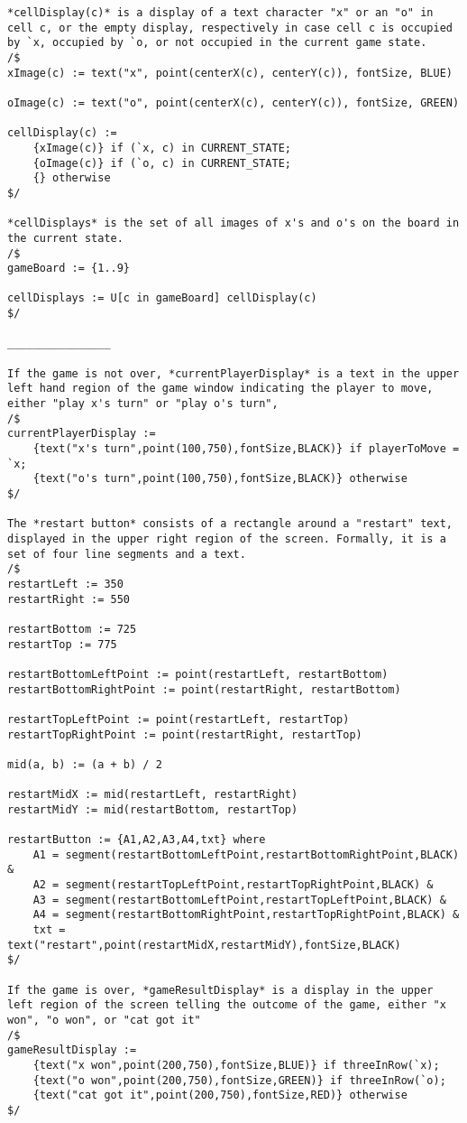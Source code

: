 \documentclass[letterpaper, 14pt]{extarticle}
\begin{document}
\begin{flushleft}
\begin{lstlisting}
*cellDisplay(c)* is a display of a text character "x" or an "o" in cell c, or the empty display, respectively in case cell c is occupied by `x, occupied by `o, or not occupied in the current game state.
/$
xImage(c) := text("x", point(centerX(c), centerY(c)), fontSize, BLUE)

oImage(c) := text("o", point(centerX(c), centerY(c)), fontSize, GREEN)

cellDisplay(c) :=
    {xImage(c)} if (`x, c) in CURRENT_STATE;
    {oImage(c)} if (`o, c) in CURRENT_STATE;
    {} otherwise
$/

*cellDisplays* is the set of all images of x's and o's on the board in the current state.
/$
gameBoard := {1..9}

cellDisplays := U[c in gameBoard] cellDisplay(c)
$/

________________

If the game is not over, *currentPlayerDisplay* is a text in the upper left hand region of the game window indicating the player to move, either "play x's turn" or "play o's turn",
/$
currentPlayerDisplay :=
    {text("x's turn",point(100,750),fontSize,BLACK)} if playerToMove = `x;
    {text("o's turn",point(100,750),fontSize,BLACK)} otherwise
$/

The *restart button* consists of a rectangle around a "restart" text, displayed in the upper right region of the screen. Formally, it is a set of four line segments and a text.
/$
restartLeft := 350
restartRight := 550

restartBottom := 725
restartTop := 775

restartBottomLeftPoint := point(restartLeft, restartBottom)
restartBottomRightPoint := point(restartRight, restartBottom)

restartTopLeftPoint := point(restartLeft, restartTop)
restartTopRightPoint := point(restartRight, restartTop)

mid(a, b) := (a + b) / 2

restartMidX := mid(restartLeft, restartRight)
restartMidY := mid(restartBottom, restartTop)

restartButton := {A1,A2,A3,A4,txt} where
    A1 = segment(restartBottomLeftPoint,restartBottomRightPoint,BLACK) &
    A2 = segment(restartTopLeftPoint,restartTopRightPoint,BLACK) &
    A3 = segment(restartBottomLeftPoint,restartTopLeftPoint,BLACK) &
    A4 = segment(restartBottomRightPoint,restartTopRightPoint,BLACK) &
    txt = text("restart",point(restartMidX,restartMidY),fontSize,BLACK)
$/

If the game is over, *gameResultDisplay* is a display in the upper left region of the screen telling the outcome of the game, either "x won", "o won", or "cat got it"
/$
gameResultDisplay :=
    {text("x won",point(200,750),fontSize,BLUE)} if threeInRow(`x);
    {text("o won",point(200,750),fontSize,GREEN)} if threeInRow(`o);
    {text("cat got it",point(200,750),fontSize,RED)} otherwise
$/


\end{lstlisting}
\end{flushleft}
\end{document}
